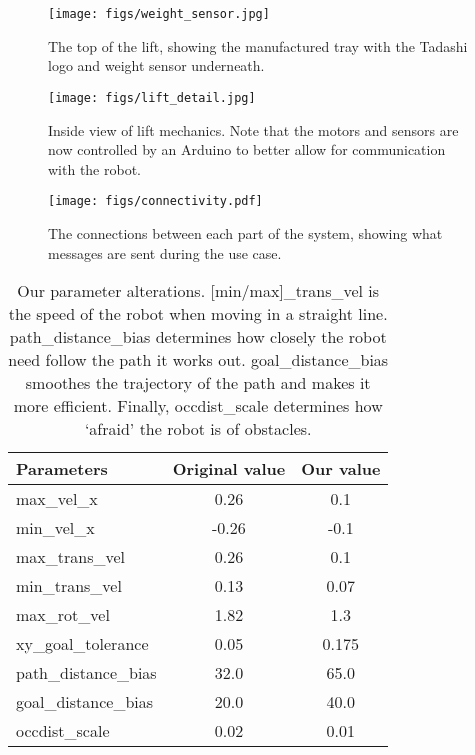 \documentclass{article}
\begin{document}
\begin{figure}
  \begin{center}
    \texttt{[image: figs/weight\_sensor.jpg]}
    \caption{The top of the lift, showing the manufactured tray with the Tadashi logo and weight sensor underneath.}
  \label{fig:sensor}
  \end{center}
\end{figure}

\begin{figure}
  \begin{center}
    \texttt{[image: figs/lift\_detail.jpg]}
    \caption{Inside view of lift mechanics. Note that the motors and sensors are now controlled by an Arduino to better allow for communication with the robot. }
  \label{fig:arduino}
  \end{center}
\end{figure}

\begin{figure*}
  \begin{center}
    \texttt{[image: figs/connectivity.pdf]}
  \end{center}
  \caption{The connections between each part of the system, showing what messages are sent during the use case.}
  \label{fig:connect-larger}
\end{figure*}

\begin{table}[h]
\vskip 3mm
\begin{center}
\begin{tabular}{lcc}
\hline
\abovespace\belowspace
Parameters & Original value & Our value \\
\hline
  max\_vel\_x & 0.26 & 0.1 \\
  min\_vel\_x & -0.26 & -0.1 \\
  max\_trans\_vel & 0.26 & 0.1 \\
  min\_trans\_vel & 0.13 & 0.07 \\
  max\_rot\_vel & 1.82 & 1.3 \\
  xy\_goal\_tolerance & 0.05 & 0.175 \\
  path\_distance\_bias & 32.0 & 65.0 \\
  goal\_distance\_bias & 20.0 & 40.0 \\
  occdist\_scale & 0.02 & 0.01
\end{tabular}
\caption{Our parameter alterations. [min/max]\_trans\_vel is the speed of the robot when moving in a straight line. path\_distance\_bias determines how closely the robot need follow the path it works out. goal\_distance\_bias smoothes the trajectory of the path and makes it more efficient. Finally, occdist\_scale determines how `afraid' the robot is of obstacles.}
\label{tab:params}
\end{center}
\vskip -3mm
\end{table}
\end{document}
